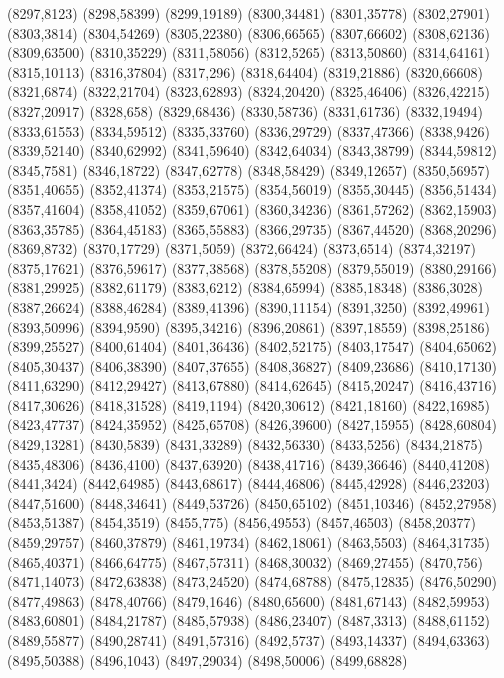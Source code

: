(8297,8123)
(8298,58399)
(8299,19189)
(8300,34481)
(8301,35778)
(8302,27901)
(8303,3814)
(8304,54269)
(8305,22380)
(8306,66565)
(8307,66602)
(8308,62136)
(8309,63500)
(8310,35229)
(8311,58056)
(8312,5265)
(8313,50860)
(8314,64161)
(8315,10113)
(8316,37804)
(8317,296)
(8318,64404)
(8319,21886)
(8320,66608)
(8321,6874)
(8322,21704)
(8323,62893)
(8324,20420)
(8325,46406)
(8326,42215)
(8327,20917)
(8328,658)
(8329,68436)
(8330,58736)
(8331,61736)
(8332,19494)
(8333,61553)
(8334,59512)
(8335,33760)
(8336,29729)
(8337,47366)
(8338,9426)
(8339,52140)
(8340,62992)
(8341,59640)
(8342,64034)
(8343,38799)
(8344,59812)
(8345,7581)
(8346,18722)
(8347,62778)
(8348,58429)
(8349,12657)
(8350,56957)
(8351,40655)
(8352,41374)
(8353,21575)
(8354,56019)
(8355,30445)
(8356,51434)
(8357,41604)
(8358,41052)
(8359,67061)
(8360,34236)
(8361,57262)
(8362,15903)
(8363,35785)
(8364,45183)
(8365,55883)
(8366,29735)
(8367,44520)
(8368,20296)
(8369,8732)
(8370,17729)
(8371,5059)
(8372,66424)
(8373,6514)
(8374,32197)
(8375,17621)
(8376,59617)
(8377,38568)
(8378,55208)
(8379,55019)
(8380,29166)
(8381,29925)
(8382,61179)
(8383,6212)
(8384,65994)
(8385,18348)
(8386,3028)
(8387,26624)
(8388,46284)
(8389,41396)
(8390,11154)
(8391,3250)
(8392,49961)
(8393,50996)
(8394,9590)
(8395,34216)
(8396,20861)
(8397,18559)
(8398,25186)
(8399,25527)
(8400,61404)
(8401,36436)
(8402,52175)
(8403,17547)
(8404,65062)
(8405,30437)
(8406,38390)
(8407,37655)
(8408,36827)
(8409,23686)
(8410,17130)
(8411,63290)
(8412,29427)
(8413,67880)
(8414,62645)
(8415,20247)
(8416,43716)
(8417,30626)
(8418,31528)
(8419,1194)
(8420,30612)
(8421,18160)
(8422,16985)
(8423,47737)
(8424,35952)
(8425,65708)
(8426,39600)
(8427,15955)
(8428,60804)
(8429,13281)
(8430,5839)
(8431,33289)
(8432,56330)
(8433,5256)
(8434,21875)
(8435,48306)
(8436,4100)
(8437,63920)
(8438,41716)
(8439,36646)
(8440,41208)
(8441,3424)
(8442,64985)
(8443,68617)
(8444,46806)
(8445,42928)
(8446,23203)
(8447,51600)
(8448,34641)
(8449,53726)
(8450,65102)
(8451,10346)
(8452,27958)
(8453,51387)
(8454,3519)
(8455,775)
(8456,49553)
(8457,46503)
(8458,20377)
(8459,29757)
(8460,37879)
(8461,19734)
(8462,18061)
(8463,5503)
(8464,31735)
(8465,40371)
(8466,64775)
(8467,57311)
(8468,30032)
(8469,27455)
(8470,756)
(8471,14073)
(8472,63838)
(8473,24520)
(8474,68788)
(8475,12835)
(8476,50290)
(8477,49863)
(8478,40766)
(8479,1646)
(8480,65600)
(8481,67143)
(8482,59953)
(8483,60801)
(8484,21787)
(8485,57938)
(8486,23407)
(8487,3313)
(8488,61152)
(8489,55877)
(8490,28741)
(8491,57316)
(8492,5737)
(8493,14337)
(8494,63363)
(8495,50388)
(8496,1043)
(8497,29034)
(8498,50006)
(8499,68828)
